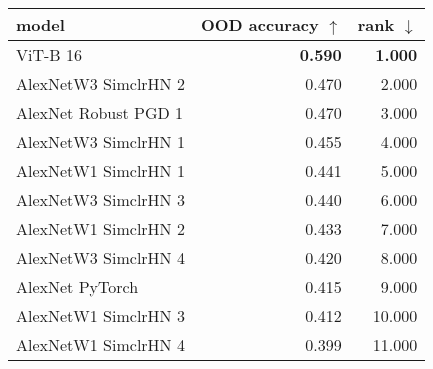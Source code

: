 \begin{tabular}{lrr}
\toprule
model & OOD accuracy $\uparrow$ & rank $\downarrow$ \\
\midrule
ViT-B 16 & \textbf{0.590} & \textbf{1.000} \\
AlexNetW3 SimclrHN 2 & 0.470 & 2.000 \\
AlexNet Robust PGD 1 & 0.470 & 3.000 \\
AlexNetW3 SimclrHN 1 & 0.455 & 4.000 \\
AlexNetW1 SimclrHN 1 & 0.441 & 5.000 \\
AlexNetW3 SimclrHN 3 & 0.440 & 6.000 \\
AlexNetW1 SimclrHN 2 & 0.433 & 7.000 \\
AlexNetW3 SimclrHN 4 & 0.420 & 8.000 \\
AlexNet PyTorch & 0.415 & 9.000 \\
AlexNetW1 SimclrHN 3 & 0.412 & 10.000 \\
AlexNetW1 SimclrHN 4 & 0.399 & 11.000 \\
\bottomrule
\end{tabular}

